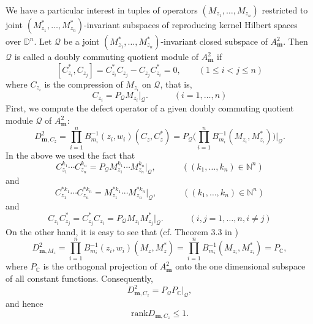 \documentclass[12pt]{amsart}
\begin{document}
We have a particular interest in tuples of operators $(M_{z_1}, \ldots,
M_{z_n})$ restricted to joint $(M_{z_1}^*, \ldots,
M_{z_n}^*)$-invariant subspaces of reproducing kernel Hilbert spaces over ${\mathbb{D}}^n$. Let ${\mathcal{Q}}$ be a joint
$(M_{z_1}^*, \ldots, M_{z_n}^*)$-invariant closed subspace of
$A^2_{\bm{m}}$. Then ${\mathcal{Q}}$ is called a doubly commuting quotient module
of $A^2_{\bm{m}}$ if
\[[C_{z_i}^*, C_{z_j}] = C_{z_i}^* C_{z_j} - C_{z_j} C_{z_i}^* = 0,
\quad \quad (1 \leq i < j \leq n)\]where $C_{z_i}$ is the
compression of $M_{z_i}$ on ${\mathcal{Q}}$, that is,
\[C_{z_i} = P_{\mathcal{Q}} M_{z_i}|_{\mathcal{Q}}. \quad \quad \quad (i= 1, \ldots,
n)\]First, we compute the defect operator of a given doubly
commuting quotient module ${\mathcal{Q}}$ of $A^2_{\bm{m}}$:
\[D^2_{{\bm{m}}, C_z} = \prod_{i=1}^n B_{m_i}^{-1}(z_i, w_i) (C_z, C_z^*)
= P_{\mathcal{Q}} \Big(\prod_{i=1}^n B_{m_i}^{-1}(M_{z_i},
M_{z_i}^*)\Big)|_{\mathcal{Q}}.\] In the above we used the fact that
\[C_{z_1}^{k_1} \cdots C_{z_n}^{k_n} = P_{\mathcal{Q}} M_{z_1}^{k_1} \cdots
M_{z_n}^{k_n}|_{\mathcal{Q}}, \quad \quad\quad ((k_1, \ldots, k_n) \in
\mathbb{N}^n)\]and\[C_{z_1}^{* k_1} \cdots C_{z_n}^{* k_n} =
M_{z_1}^{*k_1} \cdots M_{z_n}^{*k_n}|_{\mathcal{Q}}, \quad \quad\quad
((k_1, \ldots, k_n) \in \mathbb{N}^n)\] and \[C_{z_i} C_{z_j}^* =
C_{z_j}^* C_{z_i} = P_{\mathcal{Q}} M_{z_i} M_{z_j}^*|_{\mathcal{Q}}. \quad \quad
\quad (i, j = 1, \ldots, n, i \neq j)\]On the other hand, it is easy to see that (cf. Theorem 3.3 in \cite{CDS})
\[D^2_{{\bm{m}}, M_z} = \prod_{i=1}^n B_{m_i}^{-1}(z_i, w_i) (M_z,
M_z^*) = \prod_{i=1}^n B_{m_i}^{-1}(M_{z_i}, M_{z_i}^*) =
P_{\mathbb{C}},\]where $P_{\mathbb{C}}$ is the orthogonal projection
of $A^2_{\bm{m}}$ onto the one dimensional subspace of all constant
functions. Consequently, \[ D^2_{{\bm{m}}, C_z} = P_{\mathcal{Q}}
P_{\mathbb{C}}|_{\mathcal{Q}},\]and hence
\begin{equation}\label{C}\mbox{rank} D_{{\bm{m}}, C_z} \leq
1.\end{equation}
\end{document}
